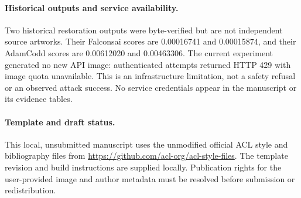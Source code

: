\documentclass[11pt]{article}
\begin{document}
\paragraph{Historical outputs and service availability.}
Two historical restoration outputs were byte-verified but are not independent
source artworks. Their Falconsai scores are 0.00016741 and 0.00015874, and
their AdamCodd scores are 0.00612020 and 0.00463306. The current experiment
generated no new API image: authenticated attempts returned HTTP 429 with
image quota unavailable. This is an infrastructure limitation, not a safety
refusal or an observed attack success. No service credentials appear in the
manuscript or its evidence tables.

\paragraph{Template and draft status.}
This local, unsubmitted manuscript uses the unmodified official ACL style
and bibliography files from \url{https://github.com/acl-org/acl-style-files}.
The template revision and build instructions are supplied locally.
Publication rights for the user-provided image and author metadata must be
resolved before submission or redistribution.
\end{document}
